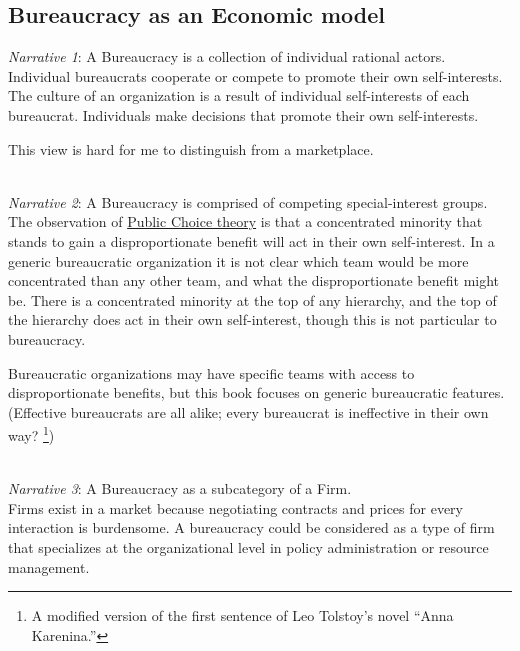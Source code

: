 
\subsection*{Bureaucracy as an Economic model}

\textit{Narrative 1}: A Bureaucracy is a collection of individual rational actors. \\
Individual bureaucrats cooperate or compete to promote their own self-interests.
The culture of an organization is a result of individual self-interests of each bureaucrat.
Individuals make decisions that promote their own self-interests.

This view is hard for me to distinguish from a marketplace. 

\ \\

\textit{Narrative 2}: A Bureaucracy is comprised of competing special-interest groups. \\
The observation of \href{https://en.wikipedia.org/wiki/Public_choice}{Public Choice theory} is that a concentrated minority that stands to gain a disproportionate benefit will act in their own self-interest. In a generic bureaucratic organization it is not clear which team would be more concentrated than any other team, and what the disproportionate benefit might be. There is a concentrated minority at the top of any hierarchy, and the top of the hierarchy does act in their own self-interest, though this is not particular to bureaucracy.

Bureaucratic organizations may have specific teams with access to disproportionate benefits, but this book focuses on generic bureaucratic features. (Effective bureaucrats are all alike; every bureaucrat is ineffective in their own way?
\footnote{A modified version of the first sentence of Leo Tolstoy's novel ``Anna Karenina.''})



\ \\

\textit{Narrative 3}: A Bureaucracy as a subcategory of a Firm. \\
Firms exist in a market because negotiating contracts and prices for every interaction is burdensome. 
A bureaucracy could be considered as a type of firm that specializes at the organizational level in policy administration or resource management. 

